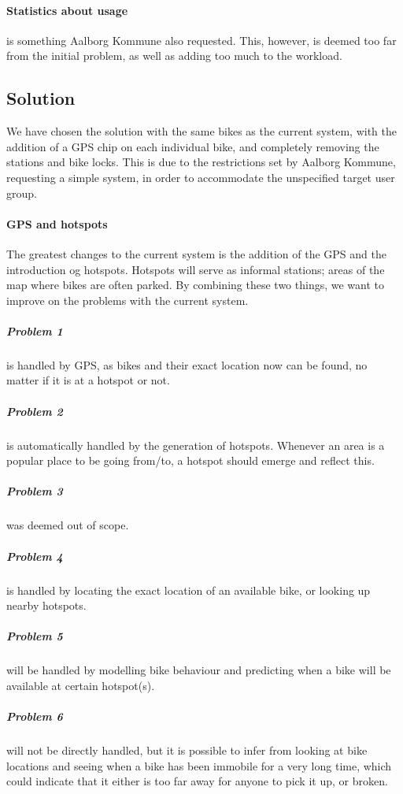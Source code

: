 \paragraph{Statistics about usage} is something Aalborg Kommune also requested.
This, however, is deemed too far from the initial problem, as well as adding too much to the workload.

\subsection{Solution}
We have chosen the solution with the same bikes as the current system, with the addition of a GPS chip on each individual bike, and completely removing the stations and bike locks.
This is due to the restrictions set by Aalborg Kommune, requesting a simple system, in order to accommodate the unspecified target user group.

\paragraph{GPS and hotspots}
The greatest changes to the current system is the addition of the GPS and the introduction og hotspots.
Hotspots will serve as informal stations; areas of the map where bikes are often parked.
By combining these two things, we want to improve on the problems with the current system.


\subparagraph{Problem 1} is handled by GPS, as bikes and their exact location now can be found, no matter if it is at a hotspot or not.

\subparagraph{Problem 2} is automatically handled by the generation of hotspots.
Whenever an area is a popular place to be going from/to, a hotspot should emerge and reflect this.

\subparagraph{Problem 3} was deemed out of scope.

\subparagraph{Problem 4} is handled by locating the exact location of an available bike, or looking up nearby hotspots.

\subparagraph{Problem 5} will be handled by modelling bike behaviour and predicting when a bike will be available at certain hotspot(s).

\subparagraph{Problem 6} will not be directly handled, but it is possible to infer from looking at bike locations and seeing when a bike has been immobile for a very long time, which could indicate that it either is too far away for anyone to pick it up, or broken.

